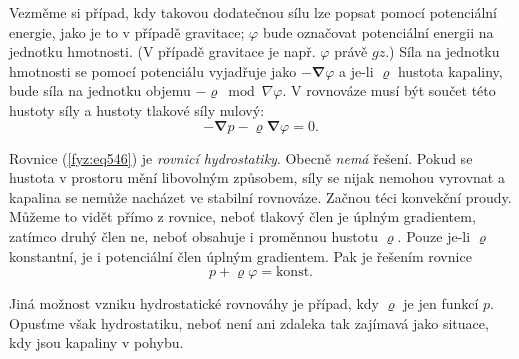 {    Vezměme si případ, kdy takovou dodatečnou sílu lze popsat pomocí potenciální energie, jako je 
    to v případě gravitace; \(\varphi\) bude označovat potenciální energii na jednotku hmotnosti. 
    (V případě gravitace je např. \(\varphi\) právě \(gz\).) Síla na jednotku hmotnosti se pomocí 
    potenciálu vyjadřuje jako \(-\symbf{\nabla}\varphi\) a je-li \(\varrho\) hustota kapaliny, bude 
    síla na jednotku objemu \(-\varrho\bmod{\nabla}\varphi\). V rovnováze musí být součet této 
    hustoty síly a hustoty tlakové síly nulový:
    \begin{equation}\label{fyz:eq546}
      - \symbf{\nabla} p - \varrho\symbf{\nabla}\varphi = 0.
    \end{equation}
    
    Rovnice (\ref{fyz:eq546}) je \emph{rovnicí hydrostatiky}. Obecně \emph{nemá} řešení. Pokud se 
    hustota v prostoru mění libovolným způsobem, síly se nijak nemohou vyrovnat a kapalina se 
    nemůže nacházet ve stabilní rovnováze. Začnou téci konvekční proudy. Můžeme to vidět přímo z 
    rovnice, neboť tlakový člen je úplným gradientem, zatímco druhý člen ne, neboť obsahuje i 
    proměnnou hustotu \(\varrho\). Pouze je-li \(\varrho\) konstantní, je i potenciální člen úplným 
    gradientem. Pak je řešením rovnice
    \begin{equation*}
      p + \varrho\varphi = \text{konst}. 
    \end{equation*}
    
    Jiná možnost vzniku hydrostatické rovnováhy je případ, kdy \(\varrho\) je jen funkcí \(p\). 
    Opusťme však hydrostatiku, neboť není ani zdaleka tak zajímavá jako situace, kdy jsou kapaliny 
    v pohybu.
    
}
